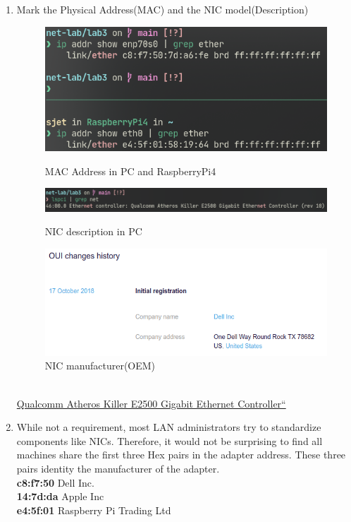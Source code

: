 \documentclass[a4paper]{ctexart}
\begin{document}
\begin{enumerate}
      \newpage
      \item Mark the Physical Address(MAC) and the NIC model(Description)
      \begin{figure}[H]
        \includegraphics*[width=1.0\textwidth]{fig/mac.png}
        \caption[]{MAC Address in PC and RaspberryPi4}
        \includegraphics*[width=1.0\textwidth]{fig/nic.png}
        \caption[]{NIC description in PC}
        \includegraphics*[width=1.0\textwidth]{fig/macman.png}
        \caption[]{NIC manufacturer(OEM)}
      \end{figure}
       \underline{}\\
       \underline{Qualcomm Atheros Killer E2500 Gigabit Ethernet Controller``}

      \item While not a requirement, most LAN administrators try to standardize components like NICs.
      Therefore, it would not be surprising to find all machines share the first three Hex pairs in the adapter address.
      These three pairs identity the manufacturer of the adapter.\\
      \textbf{c8:f7:50} Dell Inc.\\
      \textbf{14:7d:da} Apple Inc\\
      \textbf{e4:5f:01} Raspberry Pi Trading Ltd


\end{enumerate}
\end{document}
